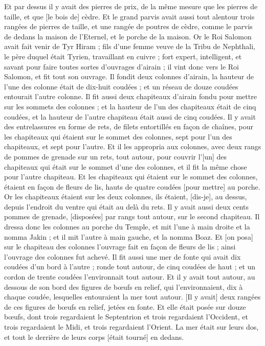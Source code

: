 \begin{multicols}{2}
Et par dessus il y avait des pierres de prix, de la même mesure que les pierres de taille, et que [le bois de] cèdre.
Et le grand parvis avait aussi tout alentour trois rangées de pierres de taille, et une rangée de poutres de cèdre, comme le parvis de dedans la maison de l'Eternel, et le porche de la maison.
Or le Roi Salomon avait fait venir de Tyr Hiram ;
fils d'une femme veuve de la Tribu de Nephthali, le père duquel était Tyrien, travaillant en cuivre ; fort expert, intelligent, et savant pour faire toutes sortes d'ouvrages d'airain ; il vint donc vers le Roi Salomon, et fit tout son ouvrage.
Il fondit deux colonnes d'airain, la hauteur de l'une des colonne était de dix-huit coudées ; et un réseau de douze coudées entourait l'autre colonne.
Il fit aussi deux chapiteaux d'airain fondu pour mettre sur les sommets des colonnes ; et la hauteur de l'un des chapiteaux était de cinq coudées, et la hauteur de l'autre chapiteau était aussi de cinq coudées.
Il y avait des entrelassures en forme de rets, de filets entortillés en façon de chaînes, pour les chapiteaux qui étaient sur le sommet des colonnes, sept pour l'un des chapiteaux, et sept pour l'autre.
Et il les appropria aux colonnes, avec deux rangs de pommes de grenade sur un rets, tout autour, pour couvrir l'[un] des chapiteaux qui était sur le sommet d'une des colonnes, et il fit la même chose pour l'autre chapiteau.
Et les chapiteaux qui étaient sur le sommet des colonnes, étaient en façon de fleurs de lis, hauts de quatre coudées [pour mettre] au porche.
Or les chapiteaux étaient sur les deux colonnes, ils étaient, [dis-je], au dessus, depuis l'endroit du ventre qui était au delà du rets. Il y avait aussi deux cents pommes de grenade, [disposées] par rangs tout autour, sur le second chapiteau.
Il dressa donc les colonnes au porche du Temple, et mit l'une à main droite et la nomma Jakin ; et il mit l'autre à main gauche, et la nomma Boaz.
Et [on posa] sur le chapiteau des colonnes l'ouvrage fait en façon de fleurs de lis ; ainsi l'ouvrage des colonnes fut achevé.
Il fit aussi une mer de fonte qui avait dix coudées d'un bord à l'autre ; ronde tout autour, de cinq coudées de haut ; et un cordon de trente coudées l'environnait tout autour.
Et il y avait tout autour, au dessous de son bord des figures de bœufs en relief, qui l'environnaient, dix à chaque coudée, lesquelles entouraient la mer tout autour. [Il y avait] deux rangées de ces figures de bœufs en relief, jetées en fonte.
Et elle était posée sur douze bœufs, dont trois regardaient le Septentrion et trois regardaient l'Occident, et trois regardaient le Midi, et trois regardaient l'Orient. La mer était sur leurs dos, et tout le derrière de leurs corps [était tourné] en dedans.

\end{multicols}

